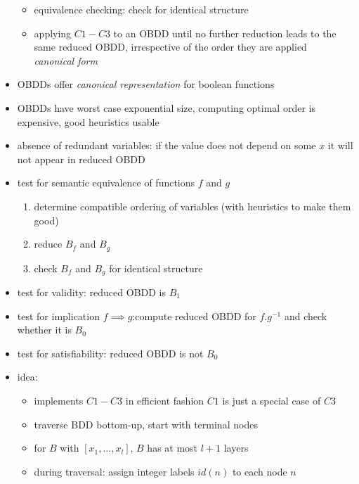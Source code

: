 \documentclass[a4paper, 10pt]{article}
\begin{document}
\begin{mdframed}
\begin{itemize}
    \begin{itemize}
        \item equivalence checking: check for identical structure
        \item applying $C1-C3$ to an OBDD until no further reduction \follows leads to the same reduced OBDD, irrespective of the order they are applied \\
        \follows \emph{canonical form}
    \end{itemize}
    \item OBDDs offer \emph{canonical representation} for boolean functions
    \item OBDDs have worst case exponential size, computing optimal order is expensive, good heuristics usable
\end{itemize}
\begin{itemize}
    \item absence of redundant variables: if the value does not depend on some $x$ it will not appear in reduced OBDD
    \item test for semantic equivalence of functions $f$ and $g$
    \begin{enumerate}
        \item determine compatible ordering of variables (with heuristics to make them good)
        \item reduce $B_f$ and $B_g$
        \item check $B_f$ and $B_g$ for identical structure
    \end{enumerate}
    \item test for validity: reduced OBDD is $B_1$
    \item test for implication $f\implies g$:compute reduced OBDD for $f.g^{-1}$ and check whether it is $B_0$
    \item test for satisfiability: reduced OBDD is not $B_0$
\end{itemize}
\begin{itemize}
    \item idea:
    \begin{itemize}
        \item implements $C1-C3$ in efficient fashion {\tiny $C1$ is just a special case of $C3$}
        \item traverse BDD bottom-up, start with terminal nodes
        \item for $B$ with $[x_1,\dots,x_l]$, $B$ has at most $l+1$ layers
        \item during traversal: assign integer labels $id(n)$ to each node $n$

\end{itemize}
\end{itemize}
\end{mdframed}
\end{document}
